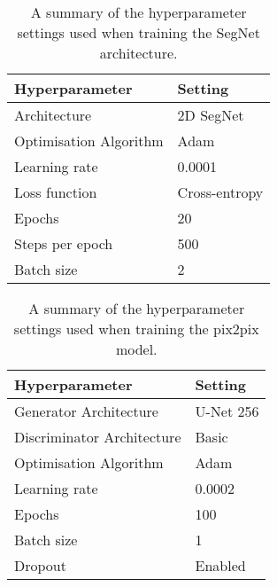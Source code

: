 \begin{table}[h]
    \centering
    \caption{A summary of the hyperparameter settings used when training the SegNet architecture.}
    \begin{tabular}{@{}ll@{}}
    \toprule
    Hyperparameter   & Setting      \\ \midrule
    Architecture     & 2D SegNet   \\
    Optimisation Algorithm & Adam \\
    Learning rate & 0.0001 \\
    Loss function & Cross-entropy \\
    Epochs & 20 \\
    Steps per epoch & 500 \\
    Batch size & 2 \\ \bottomrule
    \end{tabular}
    \label{tab:segnetparams}
\end{table}

\vspace{1cm}

\begin{table}[h]
    \centering
    \caption{A summary of the hyperparameter settings used when training the pix2pix model.}
    \begin{tabular}{@{}ll@{}}
    \toprule
    Hyperparameter   & Setting      \\ \midrule
    Generator Architecture     & U-Net 256   \\
    Discriminator Architecture     & Basic   \\
    Optimisation Algorithm & Adam \\
    Learning rate & 0.0002 \\
    Epochs & 100 \\
    Batch size & 1 \\
    Dropout & Enabled \\ \bottomrule
    \end{tabular}
    \label{tab:pix2pixparams}
\end{table}
